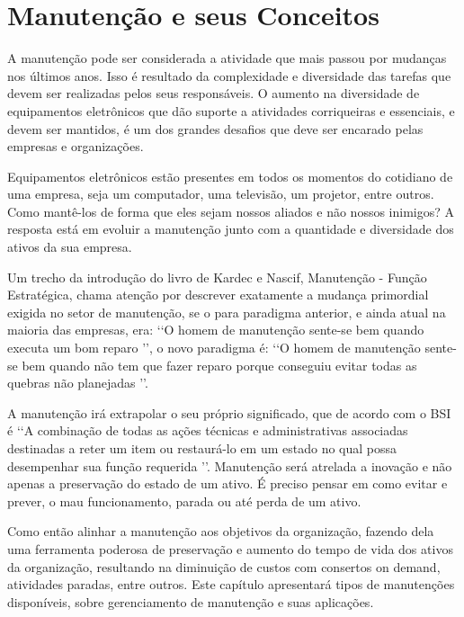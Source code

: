 \chapter{Manutenção e seus Conceitos}
\label{cap-manutencao}

A manutenção pode ser considerada a atividade que mais passou por mudanças nos últimos anos. Isso é resultado da complexidade e diversidade das tarefas que devem ser realizadas pelos seus responsáveis. O aumento na diversidade de equipamentos eletrônicos que dão suporte a atividades corriqueiras e essenciais, e devem ser mantidos, é um dos grandes desafios que deve ser encarado pelas empresas e organizações.

Equipamentos eletrônicos estão presentes em todos os momentos do cotidiano de uma empresa, seja um computador, uma televisão, um projetor, entre outros. Como mantê-los de forma que eles sejam nossos aliados e não nossos inimigos? A resposta está em evoluir a manutenção junto com a quantidade e diversidade dos ativos da sua empresa.
	
Um trecho da introdução do livro de Kardec e Nascif, Manutenção - Função Estratégica, chama atenção por descrever exatamente a mudança primordial exigida no setor de manutenção, se o para paradigma anterior, e ainda atual na maioria das empresas, era: \lq\lq O homem de manutenção sente-se bem quando executa um bom reparo \rq\rq, o novo paradigma é: \lq\lq O homem de manutenção sente-se bem quando não tem que fazer reparo porque conseguiu evitar todas as quebras não planejadas \rq\rq.
	
A manutenção irá extrapolar o seu próprio significado, que de acordo com o BSI \cite{british1993bs} é \lq\lq A combinação de todas as ações técnicas e administrativas associadas destinadas a reter um item ou restaurá-lo em um estado no qual possa desempenhar sua função requerida \rq\rq. Manutenção será atrelada a inovação e não apenas a preservação do estado de um ativo. É preciso pensar em como evitar e prever, o mau funcionamento, parada ou até perda de um ativo.
	
Como então alinhar a manutenção aos objetivos da organização, fazendo dela uma ferramenta poderosa de preservação e aumento do tempo de vida dos ativos da organização, resultando na diminuição de custos com consertos on demand, atividades paradas, entre outros. Este capítulo apresentará tipos de manutenções disponíveis, sobre gerenciamento de manutenção e suas aplicações.


